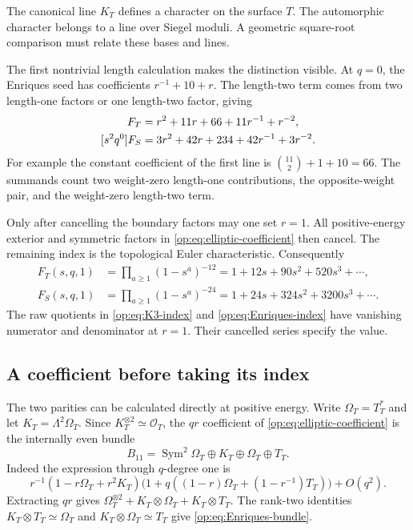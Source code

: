The canonical line $K_T$ defines a character on the surface $T$.
The automorphic character belongs to a line over Siegel moduli.
A geometric square-root comparison must relate these bases and lines.

The first nontrivial length calculation makes the distinction
visible. At $q=0$, the Enriques seed has coefficients
$r^{-1}+10+r$. The length-two term comes from two length-one
factors or one length-two factor, giving
\begin{align}
 [s^2q^0]F_T&=r^2+11r+66+11r^{-1}+r^{-2},\notag\\
 [s^2q^0]F_S&=3r^2+42r+234+42r^{-1}+3r^{-2}.
 \label{op:eq:length-two}
\end{align}
For example the constant coefficient of the first line is
$\binom{11}{2}+1+10=66$.
The summands count two weight-zero length-one contributions,
the opposite-weight pair, and the weight-zero length-two term.

Only after cancelling the boundary factors may one set $r=1$.
All positive-energy exterior and symmetric factors in
\eqref{op:eq:elliptic-coefficient} then cancel.
The remaining index is the topological Euler characteristic.
Consequently
\begin{align*}
 F_T(s,q,1)&=\prod_{a\ge1}(1-s^a)^{-12}
            =1+12s+90s^2+520s^3+\cdots,\\
 F_S(s,q,1)&=\prod_{a\ge1}(1-s^a)^{-24}
            =1+24s+324s^2+3200s^3+\cdots.
\end{align*}
The raw quotients in \eqref{op:eq:K3-index} and
\eqref{op:eq:Enriques-index} have vanishing numerator and
denominator at $r=1$. Their cancelled series specify the value.

\subsection{A coefficient before taking its index}

The two parities can be calculated directly at positive energy.
Write $\Omega_T=T_T^*$ and let $K_T=\Lambda^2\Omega_T$.
Since $K_T^{\otimes2}\simeq\mathcal O_T$, the $qr$ coefficient
of \eqref{op:eq:elliptic-coefficient} is the internally even bundle
\begin{equation}\label{op:eq:Enriques-bundle}
 B_{11}=\operatorname{Sym}^2\Omega_T\oplus K_T
                              \oplus\Omega_T\oplus T_T.
\end{equation}
Indeed the expression through $q$-degree one is
\[
 r^{-1}(1-r\Omega_T+r^2K_T)
 \bigl(1+q((1-r)\Omega_T+(1-r^{-1})T_T)\bigr)+O(q^2).
\]
Extracting $qr$ gives
$\Omega_T^{\otimes2}+K_T\otimes\Omega_T+K_T\otimes T_T$.
The rank-two identities
$K_T\otimes T_T\simeq\Omega_T$ and
$K_T\otimes\Omega_T\simeq T_T$ give
\eqref{op:eq:Enriques-bundle}.

